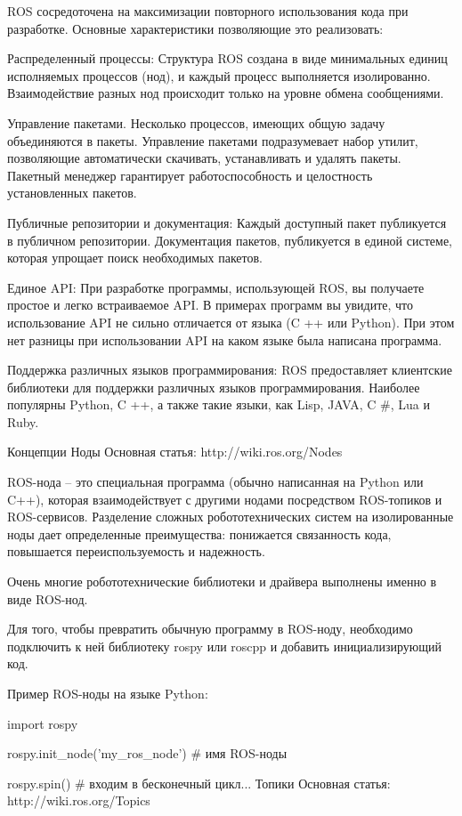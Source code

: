 ROS сосредоточена на максимизации повторного использования кода при разработке. Основные характеристики позволяющие это реализовать:

Распределенный процессы: Структура ROS создана в виде минимальных единиц исполняемых процессов (нод), и каждый процесс выполняется изолированно. Взаимодействие разных нод происходит только на уровне обмена сообщениями.

Управление пакетами. Несколько процессов, имеющих общую задачу объединяются в пакеты. Управление пакетами подразумевает набор утилит, позволяющие автоматически скачивать, устанавливать и удалять пакеты. Пакетный менеджер гарантирует работоспособность и целостность установленных пакетов.

Публичные репозитории и документация: Каждый доступный пакет публикуется в публичном репозитории. Документация пакетов, публикуется в единой системе, которая упрощает поиск необходимых пакетов.

Единое API: При разработке программы, использующей ROS, вы получаете простое и легко встраиваемое API. В примерах программ вы увидите, что использование API не сильно отличается от языка (C ++ или Python). При этом нет разницы при использовании API на каком языке была написана программа.

Поддержка различных языков программирования: ROS предоставляет клиентские библиотеки для поддержки различных языков программирования. Наиболее популярны Python, C ++, а также такие языки, как Lisp, JAVA, C #, Lua и Ruby.

Концепции
Ноды
Основная статья: http://wiki.ros.org/Nodes

ROS-нода – это специальная программа (обычно написанная на Python или C++), которая взаимодействует с другими нодами посредством ROS-топиков и ROS-сервисов. Разделение сложных робототехнических систем на изолированные ноды дает определенные преимущества: понижается связанность кода, повышается переиспользуемость и надежность.

Очень многие робототехнические библиотеки и драйвера выполнены именно в виде ROS-нод.

Для того, чтобы превратить обычную программу в ROS-ноду, необходимо подключить к ней библиотеку rospy или roscpp и добавить инициализирующий код.

Пример ROS-ноды на языке Python:

import rospy

rospy.init_node('my_ros_node')  # имя ROS-ноды

rospy.spin()  # входим в бесконечный цикл...
Топики
Основная статья: http://wiki.ros.org/Topics

